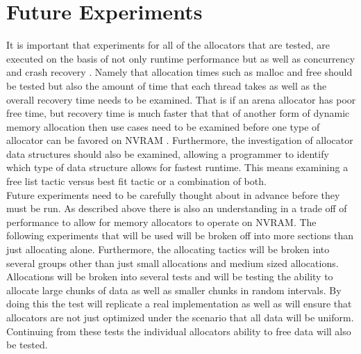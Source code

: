\documentclass[conference]{IEEEtran}
\begin{document}
\section{Future Experiments}
It is important that experiments for all of the allocators that are tested, are executed on the basis of not only runtime performance but as well as concurrency and crash recovery \cite{Makalu}\cite{FullSysCrash}. Namely that allocation times such as malloc and free should be tested but also the amount of time that each thread takes as well as the overall recovery time needs to be examined. That is if an arena allocator has poor free time, but recovery time is much faster that that of another form of dynamic memory allocation then use cases need to be examined before one type of allocator can be favored on NVRAM \cite{DynaSOAr} \cite{FreeGuard}. Furthermore, the investigation of allocator data structures should also be examined, allowing a programmer to identify which type of data structure allows for fastest runtime. This means examining a free list tactic versus best fit tactic or a combination of both. 
\\
Future experiments need to be carefully thought about in advance before they must be run. As described above there is also an understanding in a trade off of performance to allow for memory allocators to operate on NVRAM. The following experiments that will be used will be broken off into more sections than just allocating alone. Furthermore, the allocating tactics will be broken into several groups other than just small allocations and medium sized allocations. Allocations will be broken into several tests and will be testing the ability to allocate large chunks of data as well as smaller chunks in random intervals. By doing this the test will replicate a real implementation as well as will ensure that allocators are not just optimized under the scenario that all data will be uniform. Continuing from these tests the individual allocators ability to free data will also be tested. 
\end{document}
